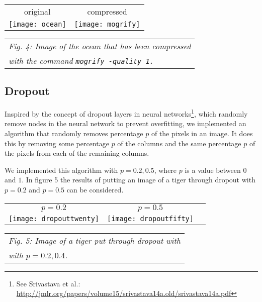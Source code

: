 \documentclass[letterpaper, 12 pt, conference]{ieeeconf}  %
\begin{document}
\vspace*{3mm}
\begin{tabular}{c c}
	original & compressed \\
	\texttt{[image: ocean]} &
		\texttt{[image: mogrify]} \\
\end{tabular}
\vspace*{3mm}
\begin{tabular}{l}
    {\it \hspace*{4mm} Fig. 4: Image of the ocean that has been compressed} \\
    {\it \hspace*{4mm} with the command {\tt mogrify -quality 1.}} \\
\end{tabular}


\subsection{Dropout}
Inspired by the concept of dropout layers in neural networks\footnote{See Srivastava et al.: \url{http://jmlr.org/papers/volume15/srivastava14a.old/srivastava14a.pdf}},
which randomly remove nodes in the neural network
to prevent overfitting, we implemented an algorithm
that randomly removes percentage $p$ of the pixels
in an image. It does this by removing
some percentage $p$ of the columns and the same percentage $p$ of the pixels
from each of the remaining columns.

We implemented this algorithm with $p=0.2,0.5$, where $p$ is a value between $0$ and $1$.
In figure 5 the results of putting an image of a tiger through dropout
with $p=0.2$ and $p=0.5$ can be considered.

\vspace*{3mm}
\begin{tabular}{c c c}
	$p=0.2$ & $p=0.5$ \\
	\texttt{[image: dropouttwenty]} &
		\texttt{[image: dropoutfifty]} \\
\end{tabular}
\begin{tabular}{l}
    {\it \hspace*{4mm} Fig. 5: Image of a tiger put through dropout with} \\
    {\it \hspace*{4mm} with $p=0.2, 0.4$.} \\
\end{tabular}
\end{document}
